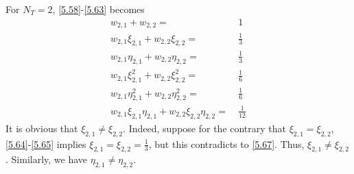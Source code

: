 \documentclass[a4paper]{article}
\numberwithin{equation}{section}
\begin{document}
For $N_T=2$, \eqref{5.58}-\eqref{5.63} becomes
\begin{align}
\label{5.64}
{w_{2,1}} + {w_{2,2}} =&\ 1\\
{w_{2,1}}{\xi _{2,1}} + {w_{2,2}}{\xi _{2,2}} =&\ \frac{1}{3}\label{5.65}\\
{w_{2,1}}{\eta _{2,1}} + {w_{2,2}}{\eta _{2,2}} =&\ \frac{1}{3}\label{5.66}\\
{w_{2,1}}\xi _{2,1}^2 + {w_{2,2}}\xi _{2,2}^2 =&\ \frac{1}{6}\label{5.67}\\
{w_{2,1}}\eta _{2,1}^2 + {w_{2,2}}\eta _{2,2}^2 =&\ \frac{1}{6}\label{5.68}\\
{w_{2,1}}{\xi _{2,1}}{\eta _{2,1}} + {w_{2,2}}{\xi _{2,2}}{\eta _{2,2}} =&\ \frac{1}{{12}} \label{5.69}
\end{align}
It is obvious that ${\xi _{2,1}} \ne {\xi _{2,2}}$. Indeed, suppose for the contrary that ${\xi _{2,1}} = {\xi _{2,2}}$, \eqref{5.64}-\eqref{5.65} implies ${\xi _{2,1}} = {\xi _{2,2}} = \frac{1}{3}$, but this contradicts to \eqref{5.67}. Thus, ${\xi _{2,1}} \ne {\xi _{2,2}}$. Similarly, we have ${\eta _{2,1}} \ne {\eta _{2,2}}$.
\end{document}
